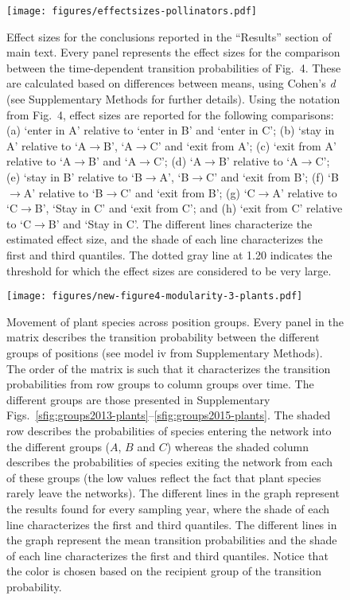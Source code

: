 \documentclass[11pt, a4paper]{article}
\begin{document}
\begin{figure}[p]
  \centering
    \vspace{0.5cm}
    \texttt{[image: figures/effectsizes-pollinators.pdf]}
	  \vspace{0.3cm}
	   \caption[Effect sizes for the comparison of the transition probabilities reported in the Fig.~4 of the main text]{Effect sizes for the conclusions reported in the ``Results'' section of main text. Every panel represents the effect sizes for the comparison between the time-dependent transition probabilities of Fig.~4. These are calculated based on differences between means, using Cohen's \textit{d} (see Supplementary Methods for further details). Using the notation from Fig.~4, effect sizes are reported for the following comparisons: (a) `enter in A' relative to `enter in B' and `enter in C'; (b) `stay in A' relative to `A$\to$B', `A$\to$C' and `exit from A'; (c) `exit from A' relative to `A$\to$B' and `A$\to$C'; (d) `A$\to$B' relative to `A$\to$C'; (e) `stay in B' relative to `B$\to$A', `B$\to$C' and `exit from B'; (f) `B$\to$A' relative to `B$\to$C' and `exit from B'; (g) `C$\to$A' relative to `C$\to$B', `Stay in C' and `exit from C'; and (h) `exit from C' relative to `C$\to$B' and `Stay in C'. The different lines characterize the estimated effect size, and the shade of each line characterizes the first and third quantiles. The dotted gray line at 1.20 indicates the threshold for which the effect sizes are considered to be very large\cite{sawilowsky2009new}.}
      \label{sfig:effectsizes}
\end{figure}

\clearpage

\begin{figure}[p]
  \centering
    \vspace{0.5cm}
    \texttt{[image: figures/new-figure4-modularity-3-plants.pdf]}
	  \vspace{0.5cm}
	   \caption[Movement of plant species across position groups]{Movement of plant species across position groups. Every panel in the matrix describes the transition probability between the different groups of positions (see model iv from Supplementary Methods). The order of the matrix is such that it characterizes the transition probabilities from row groups to column groups over time. The different groups are those presented in Supplementary Figs.~\ref{sfig:groups2013-plants}--\ref{sfig:groups2015-plants}. The shaded row describes the probabilities of species entering the network into the different groups ($A$, $B$ and $C$) whereas the shaded column describes the probabilities of species exiting the network from each of these groups (the low values reflect the fact that plant species rarely leave the networks). The different lines in the graph represent the results found for every sampling year, where the shade of each line characterizes the first and third quantiles. The different lines in the graph represent the mean transition probabilities and the shade of each line characterizes the first and third quantiles. Notice that the color is chosen based on the recipient group of the transition probability.}
      \label{sfig:dynamics-plants}
\end{figure}
\end{document}

